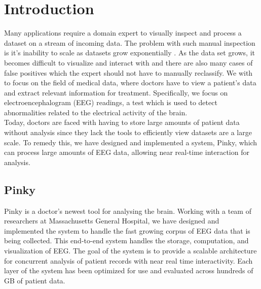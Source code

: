 \chapter{Introduction}\label{intro-ch}

Many applications require a domain expert to visually inspect and process a
dataset on a stream of incoming data. The problem with such manual inspection
is it's inability to scale as datasets grow exponentially \cite{exp-growth}. As
the data set grows, it becomes difficult to visualize and interact with
\cite{immens} and there are also many cases of false positives which the expert
should not have to manually reclassify. We with to focus on the field of
medical data, where doctors have to view a patient's data and extract relevant
information for treatment. Specifically, we focus on electroencephalogram (EEG)
readings, a test which is used to detect abnormalities related to the
electrical activity of the brain. \\

Today, doctors are faced with having to store large amounts of patient data
without analysis since they lack the tools to efficiently view datasets are a
large scale. To remedy this, we have designed and implemented a system, Pinky,
which can process large amounts of EEG data, allowing near real-time
interaction for analysis.


\section{Pinky}

Pinky is a doctor's newest tool for analysing the brain. Working with a team of
researchers at Massachusetts General Hospital, we have designed and implemented
the system to handle the fast growing corpus of EEG data that is being
collected. This end-to-end system handles the storage, computation, and
visualization of EEG. The goal of the system is to provide a scalable
architecture for concurrent analysis of patient records with near real time
interactivity. Each layer of the system has been optimized for use and
evaluated across hundreds of GB of patient data. \\


